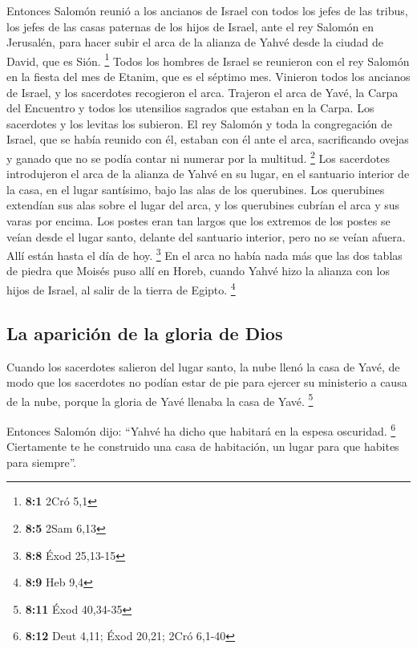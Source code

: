 \begin{paracol}{2}
 Entonces Salomón reunió a los ancianos de Israel con
todos los jefes de las tribus, los jefes de las casas paternas de los
hijos de Israel, ante el rey Salomón en Jerusalén, para hacer subir el
arca de la alianza de Yahvé desde la ciudad de David, que es Sión.
\footnote{\textbf{8:1} 2Cró 5,1}  Todos los hombres de
Israel se reunieron con el rey Salomón en la fiesta del mes de Etanim,
que es el séptimo mes.  Vinieron todos los ancianos de
Israel, y los sacerdotes recogieron el arca.  Trajeron el
arca de Yavé, la Carpa del Encuentro y todos los utensilios sagrados que
estaban en la Carpa. Los sacerdotes y los levitas los subieron.
 El rey Salomón y toda la congregación de Israel, que se
había reunido con él, estaban con él ante el arca, sacrificando ovejas y
ganado que no se podía contar ni numerar por la multitud. \footnote{\textbf{8:5}
  2Sam 6,13}  Los sacerdotes introdujeron el arca de la
alianza de Yahvé en su lugar, en el santuario interior de la casa, en el
lugar santísimo, bajo las alas de los querubines.  Los
querubines extendían sus alas sobre el lugar del arca, y los querubines
cubrían el arca y sus varas por encima.  Los postes eran
tan largos que los extremos de los postes se veían desde el lugar santo,
delante del santuario interior, pero no se veían afuera. Allí están
hasta el día de hoy. \footnote{\textbf{8:8} Éxod 25,13-15}
 En el arca no había nada más que las dos tablas de piedra
que Moisés puso allí en Horeb, cuando Yahvé hizo la alianza con los
hijos de Israel, al salir de la tierra de Egipto. \footnote{\textbf{8:9}
  Heb 9,4}

\hypertarget{la-apariciuxf3n-de-la-gloria-de-dios}{%
\subsection{La aparición de la gloria de
Dios}\label{la-apariciuxf3n-de-la-gloria-de-dios}}

 Cuando los sacerdotes salieron del lugar santo, la nube
llenó la casa de Yavé,  de modo que los sacerdotes no
podían estar de pie para ejercer su ministerio a causa de la nube,
porque la gloria de Yavé llenaba la casa de Yavé. \footnote{\textbf{8:11}
  Éxod 40,34-35}

 Entonces Salomón dijo: ``Yahvé ha dicho que habitará en
la espesa oscuridad. \footnote{\textbf{8:12} Deut 4,11; Éxod 20,21; 2Cró
  6,1-40}  Ciertamente te he construido una casa de
habitación, un lugar para que habites para siempre''.


\end{paracol}
